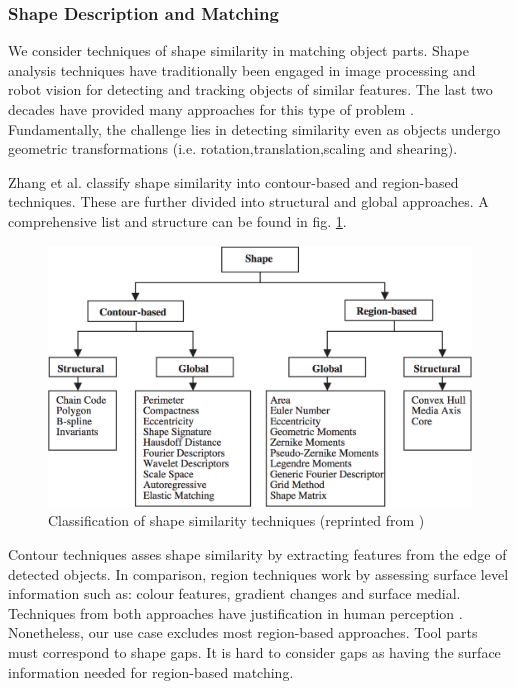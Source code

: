 \documentclass[11]{article}
\begin{document}
\subsubsection{Shape Description and Matching}

We consider techniques of shape similarity in matching object parts. Shape analysis techniques have traditionally been engaged in image processing and robot vision for detecting and tracking objects of similar features. The last two decades have provided many approaches for this type of problem \cite{loncaric1998,zhang2004,veltkamp2001,robert2012}. Fundamentally, the challenge lies in detecting similarity even as objects undergo geometric transformations (i.e. rotation,translation,scaling and shearing).     

Zhang\cite{zhang2004} et al. classify shape similarity into contour-based and region-based techniques. These are further divided into structural and global approaches. A comprehensive list and structure can be found in fig. \ref{fig:shape_similarity}.

\begin{figure}[h]
  \centering
  \includegraphics[width=1\textwidth]{./figures/similarity_techniques.png}
  \caption{Classification of shape similarity techniques (reprinted from \cite{zhang2004})}
  \label{fig:shape_similarity}
\end{figure}  

Contour techniques asses shape similarity by extracting features from the edge of detected objects. In comparison, region techniques work by assessing surface level information such as: colour features, gradient changes and surface medial. Techniques from both approaches have justification in human perception \cite{chatbri2016}. Nonetheless, our use case excludes most region-based approaches. Tool parts must correspond to shape gaps. It is hard to consider gaps as having the surface information needed for region-based matching.
\end{document}
